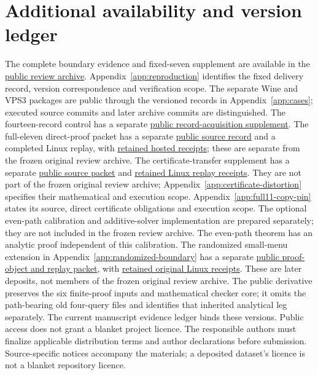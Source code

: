 \documentclass[pdflatex,sn-mathphys-num]{sn-jnl}
\theoremstyle{thmstyleone}
\theoremstyle{thmstylethree}
\theoremstyle{thmstyletwo}
\begin{document}
\section{Additional availability and version ledger}\label{app:availability-ledger}
The complete boundary evidence and fixed-seven supplement are available in the \href{https://github.com/SHiJiE1115/newproj/releases/tag/complete-six-review-20261011-v01}{public review archive}. Appendix~\ref{app:reproduction} identifies the fixed delivery record, version correspondence and verification scope. The separate Wine and VPS3 packages are public through the versioned records in Appendix~\ref{app:cases}; executed source commits and later archive commits are distinguished. The fourteen-record control has a separate \href{https://github.com/SHiJiE1115/newproj/tree/78da45ebeff7e74d0cb080114f30172fac3f09f8/theory/record_acquisition_v01}{public record-acquisition supplement}. The full-eleven direct-proof packet has a separate \href{https://github.com/SHiJiE1115/newproj/tree/37b10299e6abb9ba260012b24fc244ee90fb94d9/theory/full11_direct_v01}{public source record} and a completed Linux replay, with \href{https://github.com/SHiJiE1115/newproj/tree/cba5d748dfc44d285c44396a01af4098d4b9201d/evidence/full11_hosted_v01}{retained hosted receipts}; these are separate from the frozen original review archive. The certificate-transfer supplement has a separate \href{https://github.com/SHiJiE1115/newproj/tree/a420cd488ca63bfca0a857a103e4c85793269353/theory/certificate_transfer_v01}{public source packet} and \href{https://github.com/SHiJiE1115/newproj/tree/f68a04d13e7b082a651866ecd518c7199aac30a5/evidence/certificate_completion_hosted_v01}{retained Linux replay receipts}. They are not part of the frozen original review archive; Appendix~\ref{app:certificate-distortion} specifies their mathematical and execution scope. Appendix~\ref{app:full11-copy-pin} states its source, direct certificate obligations and execution scope. The optional even-path calibration and additive-solver implementation are prepared separately; they are not included in the frozen review archive. The even-path theorem has an analytic proof independent of this calibration. The randomized small-menu extension in Appendix~\ref{app:randomized-boundary} has a separate \href{https://github.com/SHiJiE1115/newproj/tree/aade35dbb049f64f6a66e0db8fd79fc269fb0ba5/theory/small_menu_randomization_v01}{public proof-object and replay packet}, with \href{https://github.com/SHiJiE1115/newproj/tree/1f70f518aa56f6ed368ce8d02fab5cbeb5ee3dc9/evidence/small_menu_hosted_v01}{retained original Linux receipts}. These are later deposits, not members of the frozen original review archive. The public derivative preserves the six finite-proof inputs and mathematical checker core; it omits the path-bearing old four-query files and identifies that inherited analytical leg separately. The current manuscript evidence ledger binds these versions. Public access does not grant a blanket project licence. The responsible authors must finalize applicable distribution terms and author declarations before submission. Source-specific notices accompany the materials; a deposited dataset's licence is not a blanket repository licence.
\end{document}
